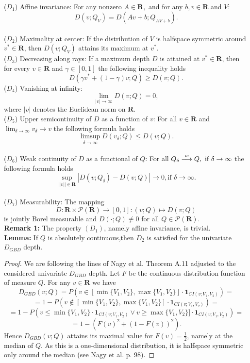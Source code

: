 \documentclass[12pt,a4paper]{article}
\numberwithin{equation}{section}
\begin{document}
\\ ($D_1$) Affine invariance: For any nonzero $A\in \mathbf{R},$ and for any $b,v\in \mathbf{R}$ and $V$:
$$D(v;Q_V)=D(Av+b;Q_{AV+b}).$$
\\($D_2$) Maximality at center: If the distribution of $V$ is halfspace symmetric around $v^* \in \mathbf{R}$, then $D(v;Q_V)$ attains its maximum at $v^*$. 
\\ ($D_3$) Decreasing along rays: If a maximum depth $D$ is attained at $v^*\in\mathbf{R}$, then for every  $v\in\mathbf{R}$ and $\gamma\in[0,1]$
the following inequality holds
$$D(\gamma v^*+(1-\gamma)v;Q)\geq D(v;Q).$$
($D_4$) Vanishing at infinity: $$\lim_{|v|\to \infty}D(v;Q)=0,$$ where $|v|$ denotes the Euclidean norm on $\mathbf{R}$.
\\ ($D_5$) Upper semicontinuity of $D$ as a function of $v$:
For all $v\in \mathbf{R}$ and $\lim_{\delta\to \infty}v_{\delta}\to v$ the following formula holds
$$\limsup_{\delta\to \infty}D(v_{\delta};Q)\leq D(v;Q).$$
\\ ($D_6$) Weak continuity of $D$ as a functional of $Q$: For all $Q_{\delta}\buildrel w\over\longrightarrow Q, \textrm{ if }\delta\rightarrow \infty$ the following formula holds
$$\sup_{||v||\in\mathbf{R}}|D(v;Q_{\delta})-D(v;Q)|\longrightarrow 0,\textrm{if } \delta\to\infty.$$
\\ ($D_7$) Measurability:
The mapping
$$D:\mathbf{R}\times \mathcal{P}(\mathbf{R})\to [0,1]:(v;Q)\mapsto D(v;Q)$$
is jointly Borel measurable and $D(\cdot;Q)\not\equiv 0$ for all $Q\in \mathcal{P}(\mathbf{R})$.
\vspace{2mm}
\\ \textbf{Remark 1:} The property $(D_1)$, namely affine invariance, is trivial.
\vspace{2mm}
\\ \textbf{Lemma:} If $Q$ is absolutely continuous,then $D_2$ is satisfied for the univariate $D_{GBD}$ depth.
\begin{proof} We are following the lines of Nagy et al. \cite{Nagy} Theorem A.11 adjusted to the considered univariate $D_{GBD}$ depth. Let $F$ be the continuous distribution function of measure $Q$. For any $v\in \mathbf{R}$ we have
$$ D_{GBD}(v;Q)=P\left( v\in [\min \{V_1,V_2\}, \max \{V_1,V_2\}]\cdot \mathbf{1}_{CI(v;V_1,V_2)} \right)=$$
$$=1-P\left( v\notin [\min \{V_1,V_2\}, \max \{V_1,V_2\}]\cdot \mathbf{1}_{CI(v;V_1,V_2)} \right)=$$ 
$$=1-P\left( v\leq \min \{V_1,V_2\}\cdot \mathbf{1}_{CI(v;V_1,V_2)} \vee v\geq \max \{V_1,V_2\}]\cdot \mathbf{1}_{CI(v;V_1,V_2)} \right)=$$
$$=1-\left(F(v)^2+(1-F(v))^2 \right).$$
Hence $D_{GBD}(v;Q)$ attains its maximal value for $F(v)=\frac12$, namely at the median of $Q$. As this is a one-dimensional distribution, it is halfspace symmetric only around the median (see Nagy et al. \cite{Nagy} p. 98).
\end{proof}
\end{document}
